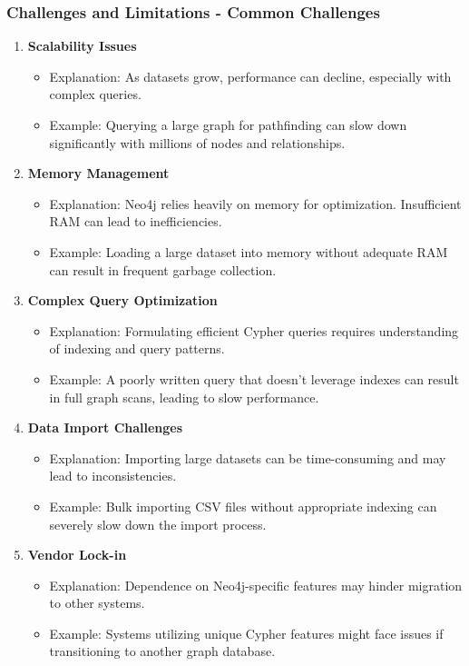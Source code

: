 \documentclass[aspectratio=169]{beamer}
\begin{document}
\begin{frame}[fragile]
    \frametitle{Challenges and Limitations - Common Challenges}
    \begin{enumerate}
        \item \textbf{Scalability Issues}
            \begin{itemize}
                \item Explanation: As datasets grow, performance can decline, especially with complex queries.
                \item Example: Querying a large graph for pathfinding can slow down significantly with millions of nodes and relationships.
            \end{itemize}
        
        \item \textbf{Memory Management}
            \begin{itemize}
                \item Explanation: Neo4j relies heavily on memory for optimization. Insufficient RAM can lead to inefficiencies.
                \item Example: Loading a large dataset into memory without adequate RAM can result in frequent garbage collection.
            \end{itemize}

        \item \textbf{Complex Query Optimization}
            \begin{itemize}
                \item Explanation: Formulating efficient Cypher queries requires understanding of indexing and query patterns.
                \item Example: A poorly written query that doesn't leverage indexes can result in full graph scans, leading to slow performance.
            \end{itemize}

        \item \textbf{Data Import Challenges}
            \begin{itemize}
                \item Explanation: Importing large datasets can be time-consuming and may lead to inconsistencies.
                \item Example: Bulk importing CSV files without appropriate indexing can severely slow down the import process.
            \end{itemize}

        \item \textbf{Vendor Lock-in}
            \begin{itemize}
                \item Explanation: Dependence on Neo4j-specific features may hinder migration to other systems.
                \item Example: Systems utilizing unique Cypher features might face issues if transitioning to another graph database.
            \end{itemize}
    \end{enumerate}
\end{frame}
\end{document}
